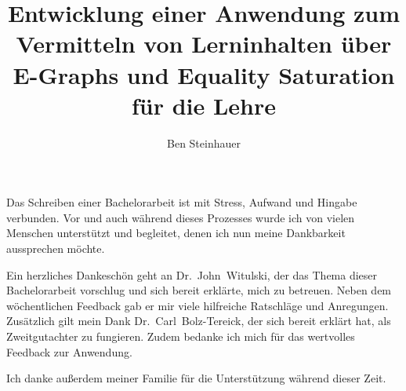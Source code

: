 \documentclass{hhuthesis}
\author{Ben Steinhauer}
\title{Entwicklung einer Anwendung zum Vermitteln von Lerninhalten über E-Graphs und Equality Saturation für die Lehre}
\begin{document}
\frontmatter
\makefrontmatter

\begin{acknowledgements}
Das Schreiben einer Bachelorarbeit ist mit Stress, Aufwand und Hingabe verbunden.
Vor und auch während dieses Prozesses wurde ich von vielen Menschen unterstützt
und begleitet, denen ich nun meine Dankbarkeit aussprechen möchte.

Ein herzliches Dankeschön geht an Dr.~John~Witulski, der das Thema dieser Bachelorarbeit
vorschlug und sich bereit erklärte, mich zu betreuen. Neben dem wöchentlichen 
Feedback gab er mir viele hilfreiche Ratschläge und Anregungen.
Zusätzlich gilt mein Dank Dr.~Carl~Bolz-Tereick, der sich bereit erklärt hat, 
als Zweitgutachter zu fungieren. Zudem bedanke ich mich für das wertvolles Feedback 
zur Anwendung.

Ich danke außerdem meiner Familie für die Unterstützung während dieser Zeit.
\end{acknowledgements}


\tableofcontents

\mainmatter




\appendix




\backmatter
\listoffigures
\lstlistoflistings
\doublespacing
\listofalgorithms
\singlespacing

\clearpage

\end{document}
